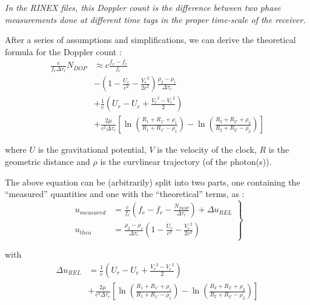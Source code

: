 \emph{In the RINEX files, this Doppler count is the difference between two phase measurements 
done at different time tags in the proper time-scale of the receiver.}

After a series of assumptions and simplifications, we can derive the theoretical 
formula for the Doppler count \cite{lemoine-2016}:
\begin{equation}
    \begin{split}
        \frac{c}{f_e \Delta\tau_r} N_{DOP} & \approx c \frac{f_e - f_r}{f_e} \\
        & - (1 - \frac{U_e}{c^2} - \frac{{V_e}^2}{2 c^2}) \frac{\rho_2 - \rho_1}{\Delta\tau_r}\\
        & + \frac{1}{c} (U_r - U_e + \frac{{V_r}^2 - {V_e}^2}{2}) \\
        & + \frac{2 \mu}{c^2 \Delta\tau_r} [\ln{(\frac{R_1 + R_{1'} + \rho_1}{R_1 + R_{1'} - \rho_1})} - \ln{(\frac{R_2 + R_{2'} + \rho_2}{R_2 + R_{2'} - \rho_2})}]
    \end{split}
\end{equation}

where \(U\) is the gravitational potential, \(V\) is the velocity of the clock, \(R\) 
is the geometric distance and \(\rho\) is the curvlinear trajectory (of the photon(s)).

The above equation can be (arbitrarily) split into two parts, one containing the ``measured'' 
quantities and one with the ``theoretical'' terms, as \cite{lemoine-2016}:
\begin{equation}
    \label{eq:lem12}
    \left.\begin{aligned}
        u_{measured} & = \frac{c}{f_e} (f_e - f_r -
         \frac{N_{DOP}}{\Delta\tau_r}) + \Delta u_{REL} \\
        u_{theo} &= \frac{\rho_2 - \rho_1}{\Delta\tau_r} (1- \frac{U_e}{c^2} - \frac{{V_e}^2}{2 c^2})
    \end{aligned}
\right\}
\end{equation}

with
\begin{equation}
    \begin{split}
        \Delta u_{REL} &= \frac{1}{c} (U_r - U_e + \frac{{V_r}^2 - {V_e}^2}{2}) \\
        & + \frac{2 \mu}{c^2 \Delta\tau_r} [\ln{(\frac{R_1 + R_{1'} + \rho_1}{R_1 + R_{1'} - \rho_1})} - \ln{(\frac{R_2 + R_{2'} + \rho_2}{R_2 + R_{2'} - \rho_2})}]
    \end{split}
\end{equation}

